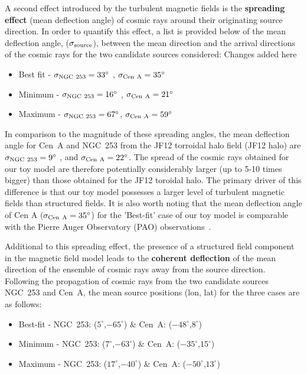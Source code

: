 \documentclass[usenatbib]{mnras}
\newcommand{\Vasu}[1]{{\color{purple}#1}}
\begin{document}
A second effect introduced by the turbulent magnetic fields is the {\bf spreading effect} (mean deflection angle) of cosmic rays around their originating source direction. In order to quantify this effect, a list is provided below of the mean deflection angle, ($\sigma_{\rm source}$), between the mean direction and the arrival directions of the cosmic rays for the two candidate sources considered:
\newline
\Vasu{Changes added here}
\begin{itemize}
        \item Best fit - $\sigma_{\rm NGC~253} = 33^{\circ}$ , {$\sigma_{\rm Cen~A} = 35^{\circ}$}
        \item Minimum - $\sigma_{\rm NGC~253} = 16^{\circ}$ , $\sigma_{\rm Cen~A} = 21^{\circ}$
        \item Maximum - $\sigma_{\rm NGC~253} = 67^{\circ}$, $\sigma_{\rm Cen~A} = 59^{\circ}$
\end{itemize}

In comparison to the magnitude of these spreading angles, the mean deflection angle for Cen~A and NGC~253 from the JF12 torroidal halo field (JF12 halo) \citep{JF12}  are  $\sigma_{\rm NGC~253} = 9^{\circ}$ , and {$\sigma_{\rm Cen~A} = 22^{\circ}$}.  The spread of the cosmic rays obtained for our toy model are therefore potentially considerably larger (up to 5-10 times bigger) than those obtained for the JF12 toroidal halo. The primary driver of this difference is that our toy model possesses a larger level of turbulent magnetic fields than structured fields. It is also worth noting that the mean deflection angle of Cen A ($\sigma_{\rm Cen~A} = 35^{\circ}$) for the 'Best-fit' case of our toy model is comparable with the Pierre Auger Observatory (PAO) observations~\citep{PierreAuger_2014, Auger_ICRC_2021}. 

Additional to this spreading effect, the presence of a structured field component in the magnetic field model leads to the {\bf coherent deflection} of the mean direction of the ensemble of cosmic rays away from the source direction. Following the propagation of cosmic rays from the two candidate sources NGC~253 and Cen~A, the mean source positions (lon, lat) for the three cases are as follows:
\begin{itemize}
    \item Best-fit - NGC~253: ($5^{\circ}$,$-65^{\circ}$) \& Cen~A: ($-48^{\circ}$,$8^{\circ}$) 
    \item Minimum - NGC~253: ($7^{\circ}$,$-63^{\circ}$) \& Cen~A: ($-35^{\circ}$,$15^{\circ}$) 
    \item Maximum - NGC~253: ($17^{\circ}$,$-40^{\circ}$) \& Cen~A: ($-50^{\circ}$,$13^{\circ}$) 
\end{itemize}
\end{document}
